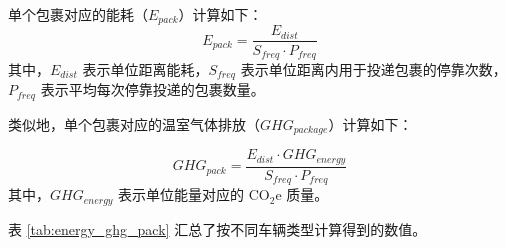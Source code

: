 \documentclass{article}
\begin{document}
单个包裹对应的能耗（$E_{pack}$）计算如下：
\begin{equation}
    E_{pack} = \frac{E_{dist}}{S_{freq}\cdot P_{freq}}
\end{equation}
其中，$E_{dist}$ 表示单位距离能耗，$S_{freq}$ 表示单位距离内用于投递包裹的停靠次数，$P_{freq}$ 表示平均每次停靠投递的包裹数量。 

类似地，单个包裹对应的温室气体排放（$GHG_{package}$）计算如下： 

\begin{equation}
    GHG_{pack} = \frac{E_{dist}\cdot GHG_{energy}}{S_{freq}\cdot P_{freq}}
\end{equation}
其中，$GHG_{energy}$ 表示单位能量对应的 CO$_{2}$e 质量。
 
表 \ref{tab:energy_ghg_pack} 汇总了按不同车辆类型计算得到的数值。
\end{document}

